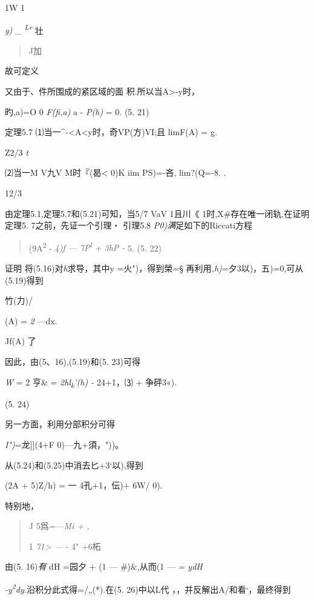 \documentclass{article}
\begin{document}
1W 1

\emph{g) \_ \textsuperscript{Lr }}壮

\begin{quote}
J加
\end{quote}

故可定义

又由于、件所围成的紧区域的面 积.所以当A\textgreater{}-y时，

旳,a)=O 0 \emph{F(fi,a)} a - \emph{P(h)} = 0. (5. 21)

定理5.7 ⑴当一\^{}-\textless{}A\textless{}y时，奇VP(方)VI;且 limF(A) = g.

Z2/3 \emph{t}

⑵当一M V九V M时『(曷\textless{} 0)K iim PS)=-吝, lim?(Q=-8. .

12/3

由定理5.1,定理5.7和(5.21)可知，当5/7 VaV 1且\textbar{}川《
1时,X\#存在唯一闭轨,在证明定理5. 7之前，先证一个引理・ 引理5.8
\emph{P0)满}足如下的Riccati方程

\begin{quote}
(9A\textsuperscript{2} - \emph{4)f --- 7P\textsuperscript{l} + 3hP -} 5.
(5. 22)
\end{quote}

证明 将(5.16)对\emph{h}求导，其中y =火")，得到榮=§
再利用\emph{,h)}=夕3以)，五)=0,可从(5.19)得到

竹(力)/

(A) = \emph{2} ---dx.

Jf(A) 了

因此，由(5、16),(5.19)和(5. 23)可得

\emph{W} = 2 亨\& = \emph{2hl\textsubscript{k}'(h) -} 24+1，⑶ + 争砰3«).

(5. 24)

另一方面，利用分部积分可得

\emph{I")}=龙{]}{]}(4+F 0)---九+須，"))。

从(5.24)和(5.25)中消去匕+3`以),得到

(2A + 5)Z/h) = 一 4孔+1，伝)+ 6W/ 0).

特别地，

\begin{quote}
J 5爲=---\emph{Mi + ,}

1 \emph{71\textgreater{} ---} - 4" +6柘
\end{quote}

由(5. 16)\emph{有} dH =园夕 + (1 --- \#)\&,从而(1 --- \emph{= ydH}

\emph{-y\textsuperscript{2}dy.}沿积分此式得=/„(*).在(5. 26)中以L代
，，并反解出A/和看`，最终得到
\end{document}
